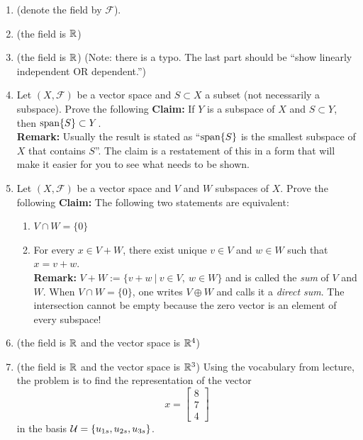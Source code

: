\documentclass[letterpaper]{article}
\begin{document}
\begin{enumerate}


\item {} (denote the field by $\mathcal{F}$).

\item {}  (the field is $\mathbb R$)

\item {} (the field is $\mathbb R$) (Note: there is a typo. The last part should be ``show linearly independent OR dependent.'')

\item  Let $(X,\mathcal{F})$ be a vector space and $S\subset X$ a subset (not necessarily a subspace).  Prove the following \textbf{Claim:} If $Y$ is a subspace of $X$ and $S \subset Y$, then $\textrm{span} \{ S \} \subset Y$.\\

    \noindent \textbf{Remark:} Usually the result is stated as  ``$\textrm{span} \{ S \}$ is the smallest subspace of $X$ that contains $S$''. The claim is a restatement of this in a form that will make it easier for you to see what needs to be shown.

\item  Let $(X,\mathcal{F})$ be a vector space and $V$ and $W$ subspaces of $X$.  Prove the following \textbf{Claim:} The following two statements are equivalent:
\begin{enumerate}
\setlength{\itemsep}{.1in}
\renewcommand{\labelenumi}{(\alph{enumi})}
\item $V \cap W = \{0\}$

\item For every $x\in V+W$, there exist unique $v\in V$ and $w\in W$ such that $x=v+w$.\\

\noindent \textbf{Remark:} $V+W := \{ v+w~|~ v\in V,~w \in W \}$ and is called the \textit{sum} of $V$ and $W$. When $V \cap W=\{0\}$, one writes $V\oplus W$ and calls it a \textit{direct sum}. The intersection cannot be empty because the zero vector is an element of every subspace!

\end{enumerate}
\item {}  (the field is $\mathbb R$ and the vector space is $\mathbb R^4$)

\item {}  (the field is $\mathbb R$ and the vector space is $\mathbb R^3$) Using the vocabulary from lecture, the problem is to find the representation of the vector
    $$ x = \begin{bmatrix} 8 \\ 7 \\4 \end{bmatrix} $$
    in the basis ${\cal U}=\{ u_{1s}, u_{2s}, u_{3s} \}$.


\end{enumerate}
\end{document}

